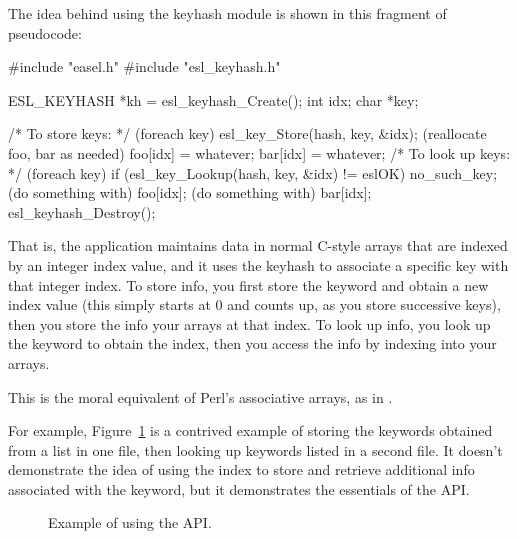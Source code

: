 The idea behind using the keyhash module is shown in this fragment of
pseudocode:

\begin{cchunk}
       #include "easel.h"
       #include "esl_keyhash.h"
     
       ESL_KEYHASH *kh = esl_keyhash_Create();
       int          idx;
       char        *key;
       
       /* To store keys: */
       (foreach key) {
          esl_key_Store(hash, key, &idx);       
          (reallocate foo, bar as needed)
          foo[idx] = whatever;
          bar[idx] = whatever;
       }     
       /* To look up keys: */
       (foreach key) {
          if (esl_key_Lookup(hash, key, &idx) != eslOK) { no_such_key; }
          (do something with) foo[idx];
          (do something with) bar[idx];
       }   
       esl_keyhash_Destroy();
\end{cchunk}

That is, the application maintains data in normal C-style arrays that
are indexed by an integer index value, and it uses the keyhash to
associate a specific key with that integer index. To store info, you
first store the keyword and obtain a new index value (this simply
starts at 0 and counts up, as you store successive keys), then you
store the info your arrays at that index. To look up info, you look up
the keyword to obtain the index, then you access the info by indexing
into your arrays.

This is the moral equivalent of Perl's associative arrays, as in
.

For example, Figure~\ref{fig:keyhash_example} is a contrived example
of storing the keywords obtained from a list in one file, then looking
up keywords listed in a second file. It doesn't demonstrate the idea
of using the index to store and retrieve additional info associated
with the keyword, but it demonstrates the essentials of the
 API.

\begin{figure}

\caption{Example of using the  API.}
\label{fig:keyhash_example}
\end{figure}

